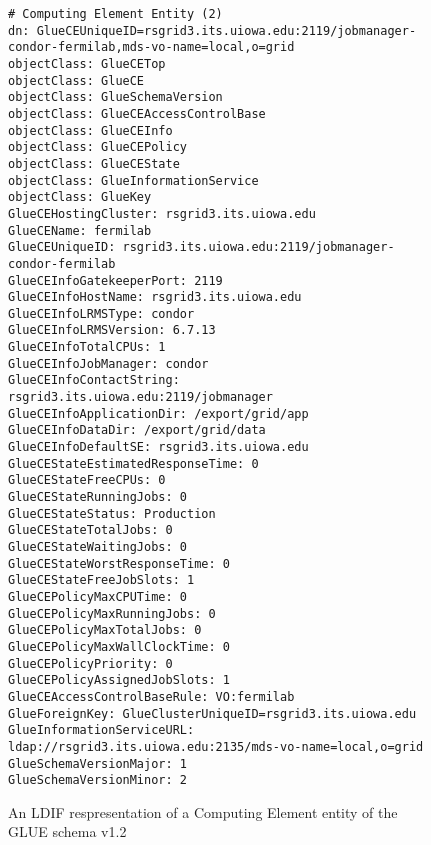 \documentclass[12pt]{article}
\begin{document}
\begin{figure}
\scriptsize
\begin{verbatim}
# Computing Element Entity (2)
dn: GlueCEUniqueID=rsgrid3.its.uiowa.edu:2119/jobmanager-condor-fermilab,mds-vo-name=local,o=grid
objectClass: GlueCETop
objectClass: GlueCE
objectClass: GlueSchemaVersion
objectClass: GlueCEAccessControlBase
objectClass: GlueCEInfo
objectClass: GlueCEPolicy
objectClass: GlueCEState
objectClass: GlueInformationService
objectClass: GlueKey
GlueCEHostingCluster: rsgrid3.its.uiowa.edu
GlueCEName: fermilab
GlueCEUniqueID: rsgrid3.its.uiowa.edu:2119/jobmanager-condor-fermilab
GlueCEInfoGatekeeperPort: 2119
GlueCEInfoHostName: rsgrid3.its.uiowa.edu
GlueCEInfoLRMSType: condor
GlueCEInfoLRMSVersion: 6.7.13
GlueCEInfoTotalCPUs: 1
GlueCEInfoJobManager: condor
GlueCEInfoContactString: rsgrid3.its.uiowa.edu:2119/jobmanager
GlueCEInfoApplicationDir: /export/grid/app
GlueCEInfoDataDir: /export/grid/data
GlueCEInfoDefaultSE: rsgrid3.its.uiowa.edu
GlueCEStateEstimatedResponseTime: 0
GlueCEStateFreeCPUs: 0
GlueCEStateRunningJobs: 0
GlueCEStateStatus: Production
GlueCEStateTotalJobs: 0
GlueCEStateWaitingJobs: 0
GlueCEStateWorstResponseTime: 0
GlueCEStateFreeJobSlots: 1
GlueCEPolicyMaxCPUTime: 0
GlueCEPolicyMaxRunningJobs: 0
GlueCEPolicyMaxTotalJobs: 0
GlueCEPolicyMaxWallClockTime: 0
GlueCEPolicyPriority: 0
GlueCEPolicyAssignedJobSlots: 1
GlueCEAccessControlBaseRule: VO:fermilab
GlueForeignKey: GlueClusterUniqueID=rsgrid3.its.uiowa.edu
GlueInformationServiceURL: ldap://rsgrid3.its.uiowa.edu:2135/mds-vo-name=local,o=grid
GlueSchemaVersionMajor: 1
GlueSchemaVersionMinor: 2
\end{verbatim}
\normalsize
\caption[LDIF Representation of a CE Entity]{
\label{LDIF-CE-2-Example} An LDIF respresentation
of a Computing Element entity of the GLUE schema v1.2}
\end{figure}
\end{document}
